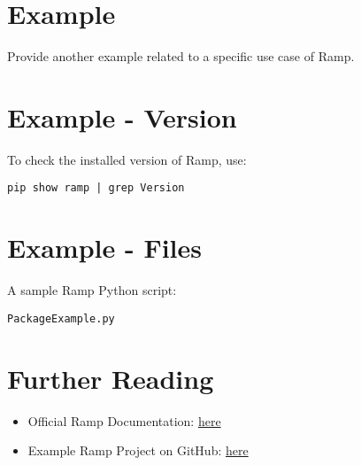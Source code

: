 \section{Example}
Provide another example related to a specific use case of Ramp.

\section{Example - Version}
To check the installed version of Ramp, use:

\begin{verbatim}
pip show ramp | grep Version
\end{verbatim}

\section{Example - Files}
A sample Ramp Python script:

\begin{verbatim}
PackageExample.py
\end{verbatim}

\section{Further Reading}
\begin{itemize}
   \item Official Ramp Documentation: \href{https://ramp.readthedocs.io/en/latest/}{here}
   \item Example Ramp Project on GitHub: \href{https://github.com/RAMP-project/RAMP}{here}
\end{itemize}


\nocite{Abadi:2016}

   \printbibliography[heading=subbibliography, segment=\therefsegment]










